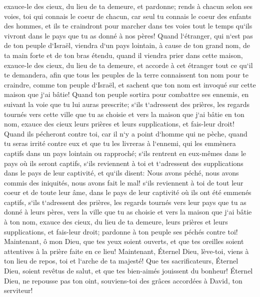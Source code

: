 \verse exauce-le des cieux, du lieu de ta demeure, et pardonne; rends à chacun selon ses voies, toi qui connais le coeur de chacun, car seul tu connais le coeur des enfants des hommes, 
\verse et ils te craindront pour marcher dans tes voies tout le temps qu`ils vivront dans le pays que tu as donné à nos pères! 
\verse Quand l`étranger, qui n`est pas de ton peuple d`Israël, viendra d`un pays lointain, à cause de ton grand nom, de ta main forte et de ton bras étendu, quand il viendra prier dans cette maison, 
\verse exauce-le des cieux, du lieu de ta demeure, et accorde à cet étranger tout ce qu`il te demandera, afin que tous les peuples de la terre connaissent ton nom pour te craindre, comme ton peuple d`Israël, et sachent que ton nom est invoqué sur cette maison que j`ai bâtie! 
\verse Quand ton peuple sortira pour combattre ses ennemis, en suivant la voie que tu lui auras prescrite; s`ils t`adressent des prières, les regards tournés vers cette ville que tu as choisie et vers la maison que j`ai bâtie en ton nom, 
\verse exauce des cieux leurs prières et leurs supplications, et fais-leur droit! 
\verse Quand ils pécheront contre toi, car il n`y a point d`homme qui ne pèche, quand tu seras irrité contre eux et que tu les livreras à l`ennemi, qui les emmènera captifs dans un pays lointain ou rapproché; 
\verse s`ils rentrent en eux-mêmes dans le pays où ils seront captifs, s`ils reviennent à toi et t`adressent des supplications dans le pays de leur captivité, et qu`ils disent: Nous avons péché, nous avons commis des iniquités, nous avons fait le mal! 
\verse s`ils reviennent à toi de tout leur coeur et de toute leur âme, dans le pays de leur captivité où ils ont été emmenés captifs, s`ils t`adressent des prières, les regards tournés vers leur pays que tu as donné à leurs pères, vers la ville que tu as choisie et vers la maison que j`ai bâtie à ton nom, 
\verse exauce des cieux, du lieu de ta demeure, leurs prières et leurs supplications, et fais-leur droit; pardonne à ton peuple ses péchés contre toi! 
\verse Maintenant, ô mon Dieu, que tes yeux soient ouverts, et que tes oreilles soient attentives à la prière faite en ce lieu! 
\verse Maintenant, Éternel Dieu, lève-toi, viens à ton lieu de repos, toi et l`arche de ta majesté! Que tes sacrificateurs, Éternel Dieu, soient revêtus de salut, et que tes bien-aimés jouissent du bonheur! 
\verse Éternel Dieu, ne repousse pas ton oint, souviens-toi des grâces accordées à David, ton serviteur! 

\chapter{}

